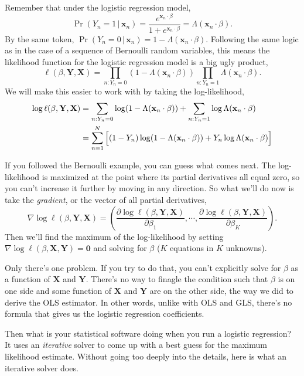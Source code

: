 \documentclass[
  12pt,
  oneside,openany]{book}
\begin{document}
Remember that under the logistic regression model,
\[
\Pr(Y_n = 1 \,|\, \mathbf{x}_n)
= \frac{e^{\mathbf{x}_n \cdot \beta}}{1 + e^{\mathbf{x}_n \cdot \beta}}
= \Lambda(\mathbf{x}_n \cdot \beta).
\]
By the same token, \(\Pr(Y_n = 0 \,|\, \mathbf{x}_n) = 1 - \Lambda(\mathbf{x}_n \cdot \beta)\).
Following the same logic as in the case of a sequence of Bernoulli random variables, this means the likelihood function for the logistic regression model is a big ugly product,
\[
\ell(\beta, \mathbf{Y}, \mathbf{X})
= \prod_{n : Y_n = 0} (1 - \Lambda(\mathbf{x}_n \cdot \beta)) \prod_{n : Y_n = 1} \Lambda(\mathbf{x}_n \cdot \beta).
\]
We will make this easier to work with by taking the log-likelihood,
\[
\begin{aligned}
\log \ell(\beta, \mathbf{Y}, \mathbf{X})
&= \sum_{n : Y_n = 0} \log (1 - \Lambda(\mathbf{x}_n \cdot \beta)) + \sum_{n : Y_n = 1} \log \Lambda (\mathbf{x}_n \cdot \beta) \\
&= \sum_{n=1}^N \left[ \vphantom{\sum} (1 - Y_n) \log (1 - \Lambda(\mathbf{x}_n \cdot \beta)) + Y_n \log \Lambda (\mathbf{x}_n \cdot \beta) \right]
\end{aligned}
\]

If you followed the Bernoulli example, you can guess what comes next.
The log-likelihood is maximized at the point where its partial derivatives all equal zero, so you can't increase it further by moving in any direction.
So what we'll do now is take the \emph{gradient}, or the vector of all partial derivatives,
\[
\nabla \log \ell(\beta, \mathbf{Y}, \mathbf{X})
= \left( \frac{\partial \log \ell(\beta, \mathbf{Y}, \mathbf{X})}{\partial \beta_1}, \cdots, \frac{\partial \log \ell(\beta, \mathbf{Y}, \mathbf{X})}{\partial \beta_K} \right).
\]
Then we'll find the maximum of the log-likelihood by setting \(\nabla \log \ell(\beta, \mathbf{X}, \mathbf{Y}) = \mathbf{0}\) and solving for \(\beta\) (\(K\) equations in \(K\) unknowns).

Only there's one problem.
If you try to do that, you can't explicitly solve for \(\beta\) as a function of \(\mathbf{X}\) and \(\mathbf{Y}\).
There's no way to finagle the condition such that \(\beta\) is on one side and some function of \(\mathbf{X}\) and \(\mathbf{Y}\) are on the other side, the way we did to derive the OLS estimator.
In other words, unlike with OLS and GLS, there's no formula that gives us the logistic regression coefficients.

Then what is your statistical software doing when you run a logistic regression?
It uses an \emph{iterative} solver to come up with a best guess for the maximum likelihood estimate.
Without going too deeply into the details, here is what an iterative solver does.
\end{document}
